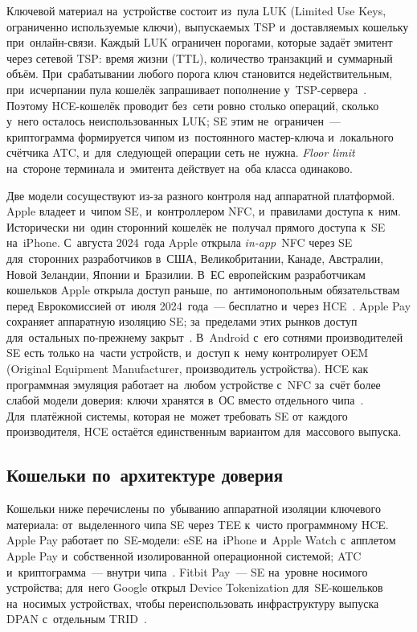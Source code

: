 Ключевой материал на~устройстве состоит из~пула LUK (Limited Use Keys,
ограниченно используемые ключи), выпускаемых TSP и~доставляемых кошельку
при~онлайн-связи.
Каждый LUK ограничен порогами, которые задаёт эмитент через сетевой TSP:
время жизни (TTL), количество транзакций и~суммарный объём. При~срабатывании
любого порога ключ становится недействительным, при~исчерпании пула кошелёк
запрашивает пополнение у~TSP-сервера~\cite{google-pay-device-tokenization-security}.
Поэтому HCE-кошелёк проводит без~сети ровно столько операций, сколько у~него
осталось неиспользованных LUK; SE этим не~ограничен~--- криптограмма
формируется чипом из~постоянного мастер-ключа и~локального счётчика ATC,
и~для~следующей операции сеть не~нужна. \textit{Floor limit} на~стороне
терминала и~эмитента действует на~оба класса одинаково.

Две модели сосуществуют из-за разного контроля над аппаратной платформой. Apple
владеет и~чипом SE, и~контроллером NFC, и~правилами доступа к~ним. Исторически
ни~один сторонний кошелёк не~получал прямого доступа к~SE на~iPhone. С~августа
2024~года Apple открыла \textit{in-app}~NFC через SE для~сторонних
разработчиков в~США, Великобритании, Канаде, Австралии, Новой Зеландии, Японии и~Бразилии. В~ЕС европейским разработчикам кошельков Apple
открыла доступ раньше, по~антимонопольным обязательствам перед Еврокомиссией
от~июля 2024~года~--- бесплатно и~через HCE~\cite{ec-apple-nfc-2024}. Apple Pay сохраняет аппаратную
изоляцию SE; за~пределами этих рынков доступ для~остальных
по-прежнему закрыт~\cite{apple-pay-security,apple-nfc-se-api-2024}. В~Android
с~его сотнями производителей SE есть только на~части устройств, и~доступ к~нему
контролирует OEM (Original Equipment Manufacturer,
производитель устройства). HCE как программная эмуляция работает на~любом
устройстве с~NFC за~счёт более слабой модели доверия: ключи хранятся в~ОС вместо
отдельного чипа~\cite{android-hce-overview}. Для~платёжной системы, которая
не~может требовать SE от~каждого производителя, HCE остаётся единственным
вариантом для~массового выпуска.

\subsection*{Кошельки по~архитектуре доверия}\label{sec:contactless-wallets-by-trust}

Кошельки ниже перечислены по~убыванию аппаратной изоляции ключевого
материала: от~выделенного чипа SE через TEE к~чисто программному HCE.
Apple Pay работает по~SE-модели: eSE на~iPhone и~Apple Watch с~апплетом
Apple Pay и~собственной изолированной операционной системой; ATC
и~криптограмма~--- внутри чипа~\cite{apple-pay-security}. Fitbit Pay~--- SE
на~уровне носимого устройства; для~него Google открыл Device Tokenization
для~SE-кошельков на~носимых устройствах, чтобы переиспользовать
инфраструктуру выпуска DPAN с~отдельным TRID~\cite{fitbit-pay-faq}.

